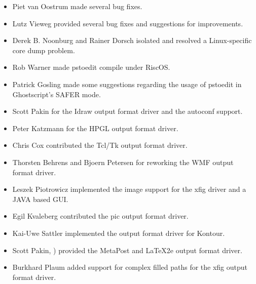 \documentclass[english,a4paper]{article}
\begin{document}
\begin{itemize}
  \item Piet van Oostrum  made several bug fixes.
  
  \item Lutz Vieweg  provided several bug fixes and
     suggestions for improvements.
     
  \item Derek B. Noonburg  and Rainer Dorsch
      isolated and resolved a
     Linux-specific core dump problem.

  \item Rob Warner  made pstoedit compile under RiscOS.
  
  \item Patrick Gosling  made some suggestions
     regarding the usage of pstoedit in Ghostscript's SAFER mode.

  \item Scott Pakin  for the Idraw output format driver and the 
	autoconf support.

  \item Peter Katzmann  for the HPGL output format driver.
  
  \item Chris Cox  contributed the Tcl/Tk output format driver.
  
  \item Thorsten Behrens  and
     Bjoern Petersen for reworking the WMF output format driver.

  \item Leszek Piotrowicz  implemented the image
     support for the xfig driver and a JAVA based GUI.

  \item Egil Kvaleberg  contributed the pic output format driver.
  
  \item Kai-Uwe Sattler  implemented the
     output format driver for Kontour.

  \item Scott Pakin,  )   provided the MetaPost and LaTeX2e output format driver.
  
  \item Burkhard Plaum  added support for
     complex filled paths for the xfig output format driver.


\end{itemize}
\end{document}
